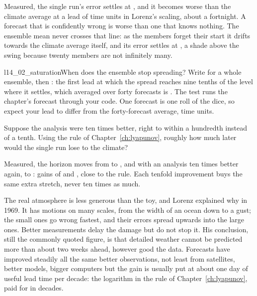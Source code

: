 
\noindent
Measured, the single run's error settles at , and it
becomes worse than the climate average at a lead of  time
units \dash{} in Lorenz's scaling, about a fortnight. A forecast that is
confidently wrong is worse than one that knows nothing. The ensemble mean
never crosses that line: as the members forget their start it drifts towards
the climate average itself, and its error settles at , a
shade above the swing because twenty members are not infinitely many.

\begin{lab}{l14_02_saturation}{When does the ensemble stop spreading?}
Write  for a whole ensemble, then : the
first lead at which the spread reaches nine tenths of the level where it
settles, which averaged over forty forecasts is . The
test runs the chapter's forecast through your code. One forecast is one roll
of the dice, so expect your lead to differ from the forty-forecast average,
 time units.
\end{lab}

\begin{think}
Suppose the analysis were ten times better, right to within a hundredth
instead of a tenth. Using the rule of Chapter~\ref{ch:lyapunov}, roughly how
much later would the single run lose to the climate?
\end{think}
Measured, the horizon moves from  to , and
with an analysis ten times better again, to : gains of
 and , close to the rule. Each
tenfold improvement buys the same extra stretch, never ten times as much.

The real atmosphere is less generous than the toy, and Lorenz explained why
in 1969. It has motions on many scales, from the width of an ocean down to a
gust; the small ones go wrong fastest, and their errors spread upwards into
the large ones. Better measurements delay the damage but do not stop it. His
conclusion, still the commonly quoted figure, is that detailed weather
cannot be predicted more than about two weeks ahead, however good the data.
Forecasts have improved steadily all the same \dash{} better observations,
not least from satellites, better models, bigger computers \dash{} but the
gain is usually put at about one day of useful lead time per decade: the
logarithm in the rule of Chapter~\ref{ch:lyapunov}, paid for in decades.

